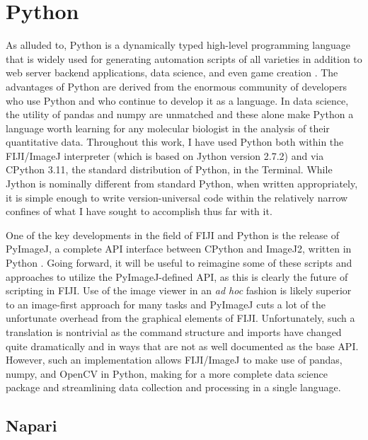 \section{Python}\label{python}

As alluded to, Python is a dynamically typed high\hyp{}level programming language that is widely used for generating automation scripts of all varieties in addition to web server backend applications, data science, and even game creation \citep{vanRossum1995}. The advantages of Python are derived from the enormous community of developers who use Python and who continue to develop it as a language. In data science, the utility of pandas and numpy are unmatched and these alone make Python a language worth learning for any molecular biologist in the analysis of their quantitative data. Throughout this work, I have used Python both within the FIJI/ImageJ interpreter (which is based on Jython version 2.7.2) and via CPython 3.11, the standard distribution of Python, in the Terminal. While Jython is nominally different from standard Python, when written appropriately, it is simple enough to write version\hyp{}universal code within the relatively narrow confines of what I have sought to accomplish thus far with it.

One of the key developments in the field of FIJI and Python is the release of PyImageJ, a complete API interface between CPython and ImageJ2, written in Python \citep{Rueden2022}. Going forward, it will be useful to reimagine some of these scripts and approaches to utilize the PyImageJ\hyp{}defined API, as this is clearly the future of scripting in FIJI. Use of the image viewer in an \textit{ad hoc} fashion is likely superior to an image\hyp{}first approach for many tasks and PyImageJ cuts a lot of the unfortunate overhead from the graphical elements of FIJI. Unfortunately, such a translation is nontrivial as the command structure and imports have changed quite dramatically and in ways that are not as well documented as the base API. However, such an implementation allows FIJI/ImageJ to make use of pandas, numpy, and OpenCV in Python, making for a more complete data science package and streamlining data collection and processing in a single language. 

\subsection{Napari}

